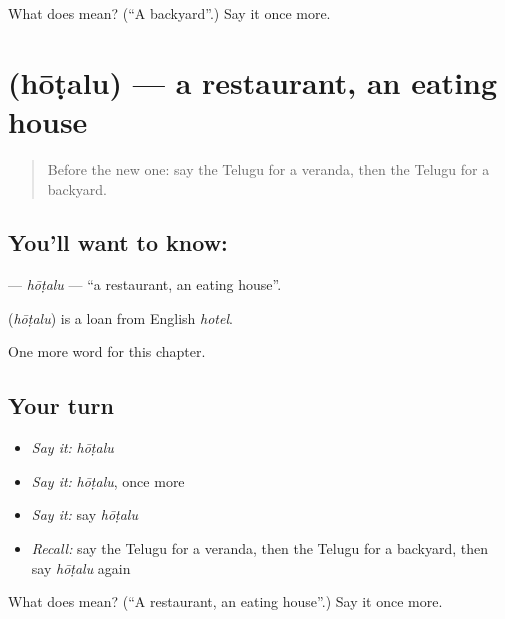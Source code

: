 \begin{tcolorbox}[breakable,colback=teal!4,colframe=teal!35!black,title={Before you move on}]
What does  mean? (\textquotedblleft{}A backyard\textquotedblright{}.) Say it once more.
\end{tcolorbox}
\section[\texorpdfstring{\te{హోటలు} (hōṭalu)}{హోటలు (hōṭalu)}]{ (hōṭalu) — a restaurant, an eating house}

\label{lesson:TE-C173-hotalu}



\begin{quote}
Before the new one: say the Telugu for a veranda, then the Telugu for a backyard.
\end{quote}

\subsection*{You'll want to know: }
\textbf{} — \emph{hōṭalu} — \textquotedblleft{}a restaurant, an eating house\textquotedblright{}.

\begin{cousinweb}
\textbf{} (\emph{hōṭalu}) is a loan from English \emph{hotel}.
\end{cousinweb}

\begin{grammarlens}[title={What you've built}]
One more word for this chapter.
\end{grammarlens}

\subsection*{Your turn}
\begin{itemize}
\raggedright
  \item \emph{Say it:} \emph{hōṭalu}
  \item \emph{Say it:} \emph{hōṭalu}, once more
  \item \emph{Say it:} say \emph{hōṭalu}
  \item \emph{Recall:} say the Telugu for a veranda, then the Telugu for a backyard, then say \emph{hōṭalu} again
\end{itemize}

\begin{tcolorbox}[breakable,colback=teal!4,colframe=teal!35!black,title={Before you move on}]
What does  mean? (\textquotedblleft{}A restaurant, an eating house\textquotedblright{}.) Say it once more.
\end{tcolorbox}
